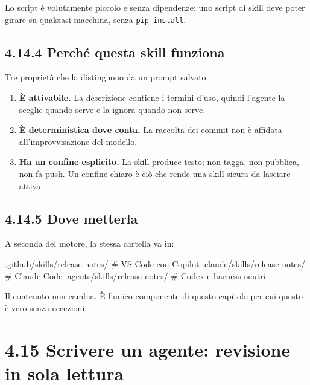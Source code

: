 \documentclass[
  italian,
  10pt,
]{book}
\newenvironment{Shaded}{\begin{snugshade}}{\end{snugshade}}
\newcommand{\NormalTok}[1]{#1}
\providecommand{\tightlist}{%
  \setlength{\itemsep}{0pt}\setlength{\parskip}{0pt}}
\begin{document}
Lo script è volutamente piccolo e senza dipendenze: uno script di skill
deve poter girare su qualsiasi macchina, senza \texttt{pip\ install}.

\subsection{4.14.4 Perché questa skill
funziona}\label{perchuxe9-questa-skill-funziona}

Tre proprietà che la distinguono da un prompt salvato:

\begin{enumerate}
\def\labelenumi{\arabic{enumi}.}
\tightlist
\item
  \textbf{È attivabile.} La descrizione contiene i termini d'uso, quindi
  l'agente la sceglie quando serve e la ignora quando non serve.
\item
  \textbf{È deterministica dove conta.} La raccolta dei commit non è
  affidata all'improvvisazione del modello.
\item
  \textbf{Ha un confine esplicito.} La skill produce testo; non tagga,
  non pubblica, non fa push. Un confine chiaro è ciò che rende una skill
  sicura da lasciare attiva.
\end{enumerate}

\subsection{4.14.5 Dove metterla}\label{dove-metterla}

A seconda del motore, la stessa cartella va in:

\begin{Shaded}
\begin{Highlighting}[]
\NormalTok{.github/skills/release{-}notes/     \# VS Code con Copilot}
\NormalTok{.claude/skills/release{-}notes/     \# Claude Code}
\NormalTok{.agents/skills/release{-}notes/     \# Codex e harness neutri}
\end{Highlighting}
\end{Shaded}

Il contenuto non cambia. È l'unico componente di questo capitolo per cui
questo è vero senza eccezioni.

\section{4.15 Scrivere un agente: revisione in sola
lettura}\label{scrivere-un-agente-revisione-in-sola-lettura}
\end{document}
